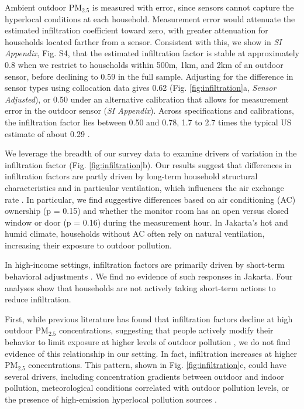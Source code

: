 \documentclass[9pt,twocolumn,twoside]{pnas-new}
\begin{document}
Ambient outdoor PM$_{2.5}$ is measured with error, since sensors cannot capture the hyperlocal conditions at each household. Measurement error would attenuate the estimated infiltration coefficient toward zero, with greater attenuation for households located farther from a sensor. Consistent with this, we show in \textit{SI Appendix}, Fig. S4, that the estimated infiltration factor is stable at approximately 0.8 when we restrict to households within 500m, 1km, and 2km of an outdoor sensor, before declining to 0.59 in the full sample. 
Adjusting for the difference in sensor types using collocation data gives 0.62 (Fig. \ref{fig:infiltration}a, \textit{Sensor Adjusted}), or 0.50 under an alternative calibration that allows for measurement error in the outdoor sensor (\textit{SI Appendix}). Across specifications and calibrations, the infiltration factor lies between 0.50 and 0.78, 1.7 to 2.7 times the typical US estimate of about 0.29 \citep{lunderberg_assessing_2023}.

We leverage the breadth of our survey data to examine drivers of variation in the infiltration factor (Fig. \ref{fig:infiltration}b). 
Our results suggest that differences in infiltration factors are partly driven by long-term household structural characteristics and in particular ventilation, which influences the air exchange rate \citep{chen_review_2011}. In particular, we find suggestive differences based on air conditioning (AC) ownership (p = 0.15) and whether the monitor room has an open versus closed window or door (p = 0.16) during the measurement hour. In Jakarta’s hot and humid climate, households without AC often rely on natural ventilation, increasing their exposure to outdoor pollution.

In high-income settings, infiltration factors are primarily driven by short-term behavioral adjustments \citep{burke_exposures_2022, baquie_know_2024}. We find no evidence of such responses in Jakarta. Four analyses show that households are not actively taking short-term actions to reduce infiltration.

First, while previous literature has found that infiltration factors decline at high outdoor PM$_{2.5}$ concentrations, suggesting that people actively modify their behavior to limit exposure at higher levels of outdoor pollution \citep{burke_exposures_2022,lunderberg_assessing_2023}, we do not find evidence of this relationship in our setting. In fact, infiltration increases at higher PM$_{2.5}$ concentrations. This pattern, shown in Fig. \ref{fig:infiltration}c, could have several drivers, including concentration gradients between outdoor and indoor pollution, meteorological conditions correlated with outdoor pollution levels, or the presence of high-emission hyperlocal pollution sources \citep{lunderberg_assessing_2023,macneill_factors_2012}.
\end{document}
